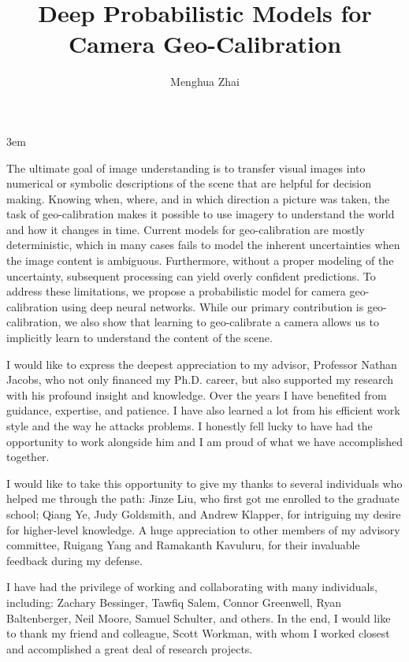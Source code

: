 \documentclass[final]{ukthesis}
\begin{document}
\emergencystretch 3em

\author{Menghua Zhai}
\title{Deep Probabilistic Models for Camera Geo-Calibration}

\abstract
{ \SingleSpacing
The ultimate goal of image understanding is to transfer visual
images into numerical or symbolic descriptions of the scene
that are helpful for decision making.
Knowing when, where, and in which direction a picture was taken, the
task of geo-calibration makes it possible to use imagery to understand
the world and how it changes in time. Current models for
geo-calibration are mostly deterministic, which in many cases fails to
model the inherent uncertainties when the image content is
ambiguous. Furthermore, without a proper modeling of the uncertainty, subsequent
processing can yield overly confident predictions.
To address these limitations, we propose a probabilistic model for
camera geo-calibration using deep neural networks.
While our primary contribution is geo-calibration, we also show that
learning to geo-calibrate a camera allows us to implicitly learn to
understand the content of the scene.
}


\frontmatter
\maketitle

\begin{acknowledgments}
  I would like to express the deepest appreciation to my advisor,
Professor Nathan Jacobs, who not only financed my Ph.D. career, but
also supported my research with his profound insight
and knowledge. Over the years I have benefited from guidance,
expertise, and patience. I have also learned a lot from his efficient
work style and the way he attacks problems. I honestly fell lucky to
have had the opportunity to work alongside him and I am proud of what
we have accomplished together.

I would like to take this opportunity to give my thanks to several
individuals who helped me through the path:  Jinze Liu, who
first got me enrolled to the graduate school; 
Qiang Ye, Judy Goldsmith, and Andrew Klapper, for intriguing
my desire for higher-level knowledge. A huge appreciation to 
other members of my advisory committee, Ruigang Yang and Ramakanth
Kavuluru, for their invaluable feedback during my defense.

I have had the privilege of working and collaborating with many
individuals, including: Zachary Bessinger, Tawfiq Salem, Connor
Greenwell, Ryan Baltenberger, Neil Moore, Samuel Schulter, and others.
In the end, I would like to thank my friend and colleague, Scott
Workman, with whom I worked closest and accomplished a great deal of
research projects.
\end{acknowledgments}
\end{document}
